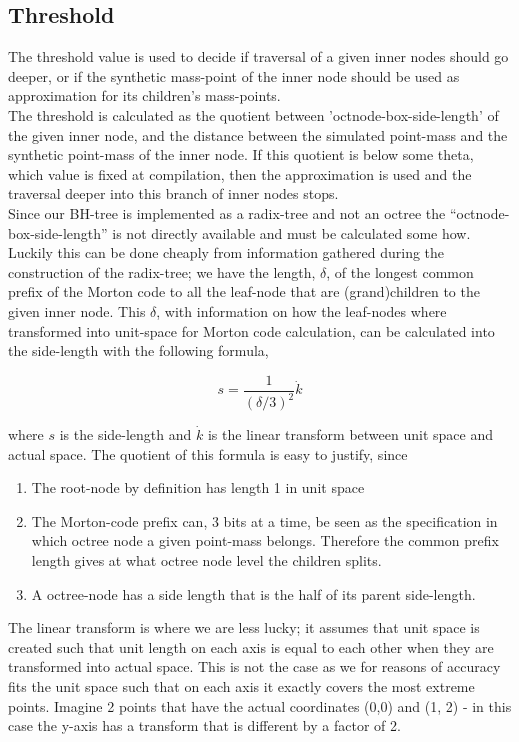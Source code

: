 \subsection{Threshold}
The threshold value is used to decide if traversal of a given inner nodes should go
deeper, or if the synthetic mass-point of the inner node should be used as
approximation for its children's mass-points. \\


The threshold is calculated as the quotient between 'octnode-box-side-length' of
the given inner node, and the distance between the simulated point-mass and the
synthetic point-mass of the inner node. If this quotient is below some theta,
which value is fixed at compilation, then the approximation is used and the
traversal deeper into this branch of inner nodes stops. \\

Since our BH-tree is implemented as a radix-tree and not an octree the
``octnode-box-side-length'' is not directly available and must be calculated some
how. Luckily this can be done cheaply from information gathered during the
construction of the radix-tree; we have the length, $\delta$, of the longest
common prefix of the Morton code to all the leaf-node that are (grand)children
to the given inner node. This $\delta$, with information on how the leaf-nodes
where transformed into unit-space for Morton code calculation, can be calculated
into the side-length with the following formula,

$$s = \frac{1}{(\delta / 3)^2} \dot k$$

where $s$ is the side-length and $\dot k$ is the linear transform between unit
space and actual space. The quotient of this formula is easy to justify, since
\begin{enumerate}
\item The root-node by definition has length 1 in unit space
\item The Morton-code prefix can, 3 bits at a time, be seen as the specification
  in which octree node a given point-mass belongs. Therefore the common prefix length
  gives at what octree node level the children splits.
  \item A octree-node has a side length that is the half of its parent
    side-length.
\end{enumerate}
The linear transform is where we are less lucky; it assumes that unit space is
created such that unit length on each axis is equal to each other when they are
transformed into actual space. This is not the case as we for reasons of accuracy
fits the unit space such that on each axis it exactly covers the most extreme
points. Imagine 2 points that have the actual coordinates (0,0) and (1, 2) - in this
case the y-axis has a transform that is different by a factor of 2. \\

